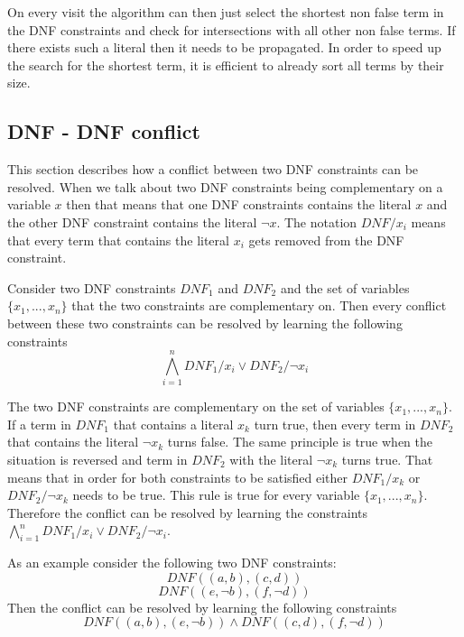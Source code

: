 On every visit the algorithm can then just select the shortest non false term in the DNF constraints and check for intersections with all other non false terms. If there exists such a literal then it needs to be propagated. In order to speed up the search for the shortest term, it is efficient to already sort all terms by their size.

\subsection{DNF - DNF conflict}

This section describes how a conflict between two DNF constraints can be resolved. When we talk about two DNF constraints being complementary on a variable $x$ then that means that one DNF constraints contains the literal $x$ and the other DNF constraint contains the literal $\neg x$. The notation $DNF/x_i$ means that every term that contains the literal $x_i$ gets removed from the DNF constraint.
\begin{leftbar}
Consider two DNF constraints $DNF_1$ and $DNF_2$ and the set of variables $\{x_1,...,x_n\}$ that the two constraints are complementary on. Then every conflict between these two constraints can be resolved by learning the following constraints
\begin{displaymath}
\bigwedge_{i=1}^{n} DNF_1 / x_i \vee DNF_2 / \neg x_i
\end{displaymath}
\end{leftbar}
The two DNF constraints are complementary on the set of variables $\{x_1,...,x_n\}$. If a term in $DNF_1$ that contains a literal $x_k$ turn true, then every term in $DNF_2$ that contains the literal $\neg x_k$ turns false. The same principle is true when the situation is reversed and term in $DNF_2$ with the literal $\neg x_k$ turns true. That means that in order for both constraints to be satisfied either $DNF_1/x_k$ or $DNF_2/\neg x_k$ needs to be true. This rule is true for every variable $\{x_1,...,x_n\}$. Therefore the conflict can be resolved by learning the constraints $\bigwedge_{i=1}^{n} DNF_1 / x_i \vee DNF_2 / \neg x_i$.

As an example consider the following two DNF constraints:
\begin{displaymath}
DNF ((a,b),(c,d))
\end{displaymath}
\begin{displaymath}
DNF ((e,\neg b),(f,\neg d))
\end{displaymath}
Then the conflict can be resolved by learning the following constraints
\begin{displaymath}
DNF ((a,b),(e,\neg b)) \wedge DNF ((c,d),(f,\neg d))
\end{displaymath}


